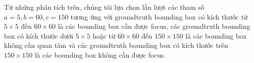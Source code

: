 {    \noindent
    Từ những phân tích trên, chúng tôi lựa chọn lần lượt các tham số $a = 5, b = 60, c = 150$ tương ứng với groundtruth bounding box có kích thước từ $5 \times 5$ đến $60 \times 60$ là các bounding box cần được focus, các groundtruth bounding box có kích thước dưới $5 \times 5$ hoặc từ $60 \times 60$ đến $150 \times 150$ là các bounding box không cần quan tâm và các groundtruth bounding box có kích thước trên $150 \times 150$ là các bounding box không cần được focus.
}
